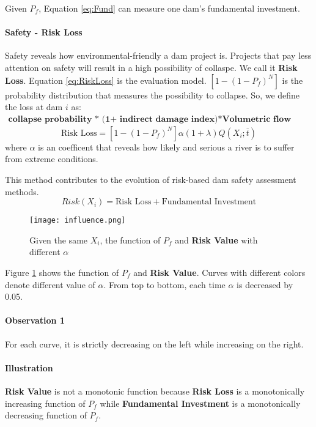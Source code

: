 \documentclass{mcmthesis}
\begin{document}
Given $P_f$, Equation \eqref{eq:Fund} can measure one dam's fundamental investment.

\paragraph{Safety - Risk Loss} Safety reveals how environmental-friendly a dam project is. Projects that pay less attention on safety will result in a high possibility of collaspe. We call it \textbf{Risk Loss}. Equation \eqref{eq:RiskLoss} is the evaluation model.  $[1-(1-P_f)^N]$ is the probability distribution that measures the possibility to collapse. So, we define the loss at dam $i$ as:
\begin{align*}
\textbf{collapse probability *  (1+ indirect damage index)*Volumetric flow rate}
\end{align*}
\begin{equation}
\label{eq:RiskLoss}
\text{Risk Loss} = [1-(1-P_f)^N]\alpha(1+\lambda)Q(X_i;\overline{t})
\end{equation}
where $\alpha$ is an coefficent that reveals how likely and serious a river is to suffer from extreme conditions.

This method contributes to the evolution of risk-based dam safety assessment methods.
$$
Risk(X_i) = \text{Risk Loss} + \text{Fundamental Investment}
$$
\begin{figure}[h]
    \centering
    \texttt{[image: influence.png]}
    \caption{Given the same $X_i$, the function of \textbf{$P_f$} and \textbf{Risk Value} with different $\alpha$}
    \label{fig:influence}
\end{figure}

Figure \ref{fig:influence} shows the function of \textbf{$P_f$} and \textbf{Risk Value}. Curves with different colors denote different value of $\alpha$. From top to bottom, each time $\alpha$ is decreased by 0.05.\\
\paragraph{Observation 1}
For each curve, it is strictly decreasing on the left while increasing on the right.
\paragraph{Illustration}
\textbf{Risk Value} is not a monotonic function because \textbf{Risk Loss} is a monotonically increasing function of $P_f$ while \textbf{Fundamental Investment} is a monotonically decreasing function of $P_f$.
\end{document}
